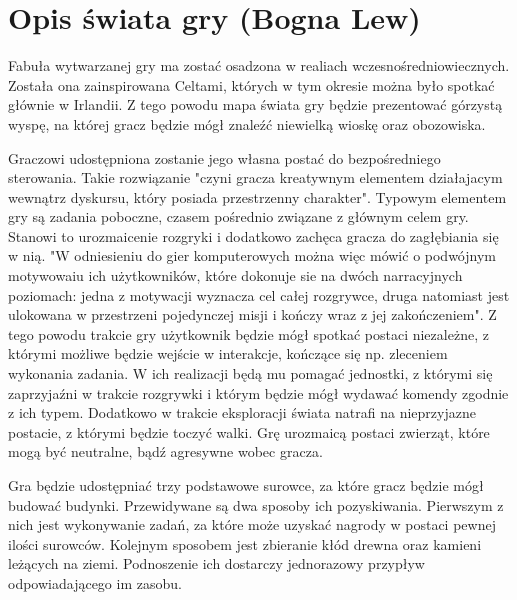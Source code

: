 \section{Opis świata gry (Bogna Lew)}
Fabuła wytwarzanej gry ma zostać osadzona w realiach wczesnośredniowiecznych. Została ona zainspirowana Celtami, których
w tym okresie można było spotkać głównie w Irlandii. Z tego powodu mapa świata gry będzie prezentować górzystą wyspę, na
której gracz będzie mógł znaleźć niewielką wioskę oraz obozowiska.

Graczowi udostępniona zostanie jego własna postać do bezpośredniego sterowania. Takie rozwiązanie "czyni gracza
kreatywnym elementem działajacym wewnątrz dyskursu, który posiada przestrzenny charakter"\cite{olbrzymwcieniu}. Typowym
elementem gry są zadania poboczne, czasem pośrednio związane z głównym celem gry. Stanowi to urozmaicenie rozgryki i
dodatkowo zachęca gracza do zagłębiania się w nią. "W odniesieniu do gier komputerowych można więc mówić o podwójnym
motywowaiu ich użytkowników, które dokonuje sie na dwóch narracyjnych poziomach: jedna z motywacji wyznacza cel całej
rozgrywce, druga natomiast jest ulokowana w przestrzeni pojedynczej misji i kończy wraz z jej zakończeniem"\cite{olbrzymwcieniu}.
Z tego powodu trakcie gry użytkownik będzie mógł spotkać postaci niezależne, z którymi możliwe będzie wejście w interakcje, kończące
się np. zleceniem wykonania zadania. W ich realizacji będą mu pomagać jednostki, z którymi się zaprzyjaźni w trakcie
rozgrywki i którym będzie mógł wydawać komendy zgodnie z ich typem. Dodatkowo w trakcie eksploracji świata natrafi na
nieprzyjazne postacie, z którymi będzie toczyć walki. Grę urozmaicą postaci zwierząt, które mogą być neutralne, bądź
agresywne wobec gracza.

Gra będzie udostępniać trzy podstawowe surowce, za które gracz będzie mógł budować budynki. Przewidywane są dwa sposoby
ich pozyskiwania. Pierwszym z nich jest wykonywanie zadań, za które może uzyskać nagrody w postaci pewnej ilości
surowców. Kolejnym sposobem jest zbieranie kłód drewna oraz kamieni leżących na ziemi. Podnoszenie ich dostarczy
jednorazowy przypływ odpowiadającego im zasobu.
